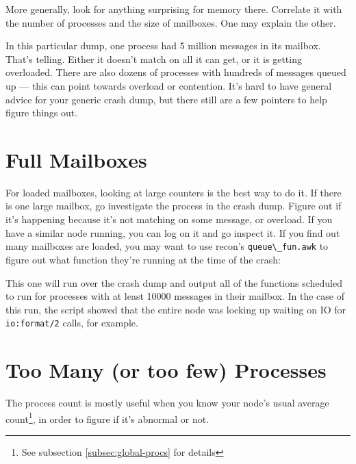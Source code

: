 \documentclass[11pt, oneside]{book}   	%
\newcommand{\app}[1]{\Verb`#1`}
\newcommand{\function}[1]{\Verb`#1`}
\begin{document}
More generally, look for anything surprising for memory there. Correlate it with the number of processes and the size of mailboxes. One may explain the other. 

In this particular dump, one process had 5 million messages in its mailbox. That's telling. Either it doesn't match on all it can get, or it is getting overloaded. There are also dozens of processes with hundreds of messages queued up — this can point towards overload or contention. It's hard to have general advice for your generic crash dump, but there still are a few pointers to help figure things out.

\section{Full Mailboxes}
\label{sec:crash-full-mailboxes}

For loaded mailboxes, looking at large counters is the best way to do it. If there is one large mailbox, go investigate the process in the crash dump. Figure out if it's happening because it's not matching on some message, or overload. If you have a similar node running, you can log on it and go inspect it. If you find out many mailboxes are loaded, you may want to use recon's \app{queue\_fun.awk} to figure out what function they're running at the time of the crash:


This one will run over the crash dump and output all of the functions scheduled to run for processes with at least 10000 messages in their mailbox. In the case of this run, the script showed that the entire node was locking up waiting on IO for \function{io:format/2} calls, for example.

\section{Too Many (or too few) Processes}

The process count is mostly useful when you know your node's usual average count\footnote{See subsection \ref{subsec:global-procs} for details}, in order to figure if it's abnormal or not.
\end{document}
